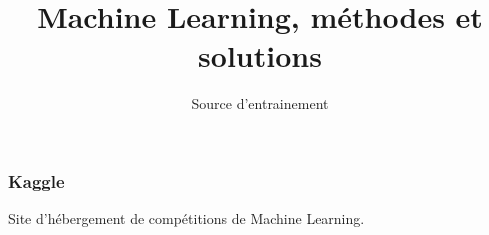 \documentclass{formation}
\title{Machine Learning, méthodes et solutions}
\subtitle{Source d'entrainement}
\begin{document}
\maketitle

\begin{frame}
  \frametitle{Kaggle}
  Site d'hébergement de compétitions de Machine Learning.
\end{frame}
\end{document}
